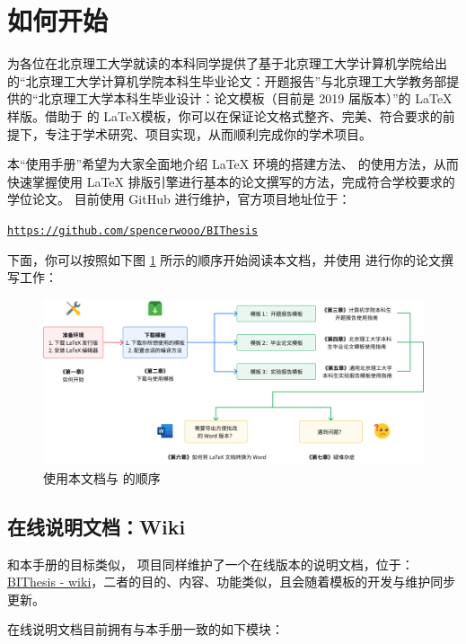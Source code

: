 \section{如何开始}
 {\BIThesis} 为各位在北京理工大学就读的本科同学提供了基于北京理工大学计算机学院给出的“北京理工大学计算机学院本科生毕业论文：开题报告”与北京理工大学教务部提供的“北京理工大学本科生毕业设计：论文模板（目前是 2019 届版本）”的 \LaTeX 样版。借助于 {\BIThesis} 的 \LaTeX 模板，你可以在保证论文格式整齐、完美、符合要求的前提下，专注于学术研究、项目实现，从而顺利完成你的学术项目。

本“使用手册”希望为大家全面地介绍 {\LaTeX} 环境的搭建方法、{\BIThesis} 的使用方法，从而快速掌握使用 {\LaTeX} 排版引擎进行基本的论文撰写的方法，完成符合学校要求的学位论文。{\BIThesis} 目前使用 GitHub 进行维护，官方项目地址位于：

\begin{center}
  \color{ForestGreen}\href{https://github.com/spencerwooo/BIThesis}{\texttt{https://github.com/spencerwooo/BIThesis}}
\end{center}

下面，你可以按照如下图 \ref{flowchart} 所示的顺序开始阅读本文档，并使用 {\BIThesis} 进行你的论文撰写工作：

\begin{figure}[H]
  \centering
  \includegraphics[width=\textwidth]{images/flowchart.png}
  \caption{使用本文档与 {\BIThesis} 的顺序}
  \label{flowchart}
\end{figure}

\subsection{在线说明文档：Wiki}
和本手册的目标类似，{\BIThesis} 项目同样维护了一个在线版本的说明文档，位于：{\href{https://bithesis.spencerwoo.com/}{BIThesis - wiki}}，二者的目的、内容、功能类似，且会随着模板的开发与维护同步更新。

{\BIThesis} 在线说明文档目前拥有与本手册一致的如下模块：

